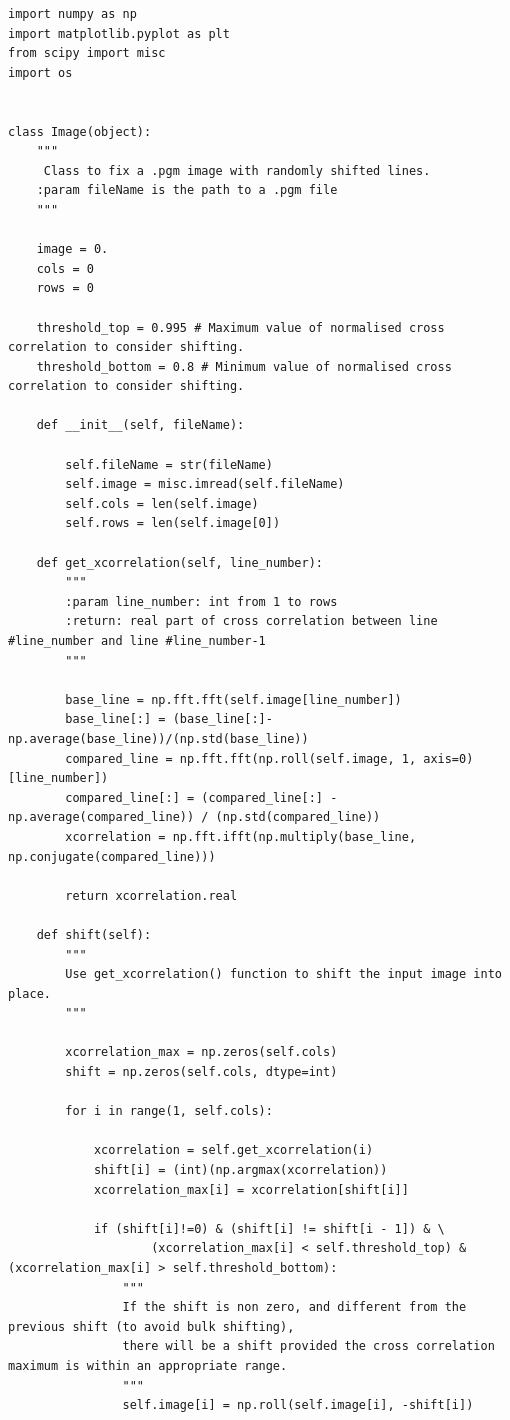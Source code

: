 \documentclass[a4paper,12pt]{article}
\begin{document}
\begin{lstlisting}[language=numpy]
import numpy as np
import matplotlib.pyplot as plt
from scipy import misc
import os


class Image(object):
    """
     Class to fix a .pgm image with randomly shifted lines.
    :param fileName is the path to a .pgm file
    """

    image = 0.
    cols = 0
    rows = 0

    threshold_top = 0.995 # Maximum value of normalised cross correlation to consider shifting.
    threshold_bottom = 0.8 # Minimum value of normalised cross correlation to consider shifting.

    def __init__(self, fileName):

        self.fileName = str(fileName)
        self.image = misc.imread(self.fileName)
        self.cols = len(self.image)
        self.rows = len(self.image[0])

    def get_xcorrelation(self, line_number):
        """
        :param line_number: int from 1 to rows
        :return: real part of cross correlation between line #line_number and line #line_number-1
        """

        base_line = np.fft.fft(self.image[line_number])
        base_line[:] = (base_line[:]-np.average(base_line))/(np.std(base_line))
        compared_line = np.fft.fft(np.roll(self.image, 1, axis=0)[line_number])
        compared_line[:] = (compared_line[:] - np.average(compared_line)) / (np.std(compared_line))
        xcorrelation = np.fft.ifft(np.multiply(base_line, np.conjugate(compared_line)))

        return xcorrelation.real

    def shift(self):
        """
        Use get_xcorrelation() function to shift the input image into place.
        """

        xcorrelation_max = np.zeros(self.cols)
        shift = np.zeros(self.cols, dtype=int)

        for i in range(1, self.cols):

            xcorrelation = self.get_xcorrelation(i)
            shift[i] = (int)(np.argmax(xcorrelation))
            xcorrelation_max[i] = xcorrelation[shift[i]]

            if (shift[i]!=0) & (shift[i] != shift[i - 1]) & \
                    (xcorrelation_max[i] < self.threshold_top) & (xcorrelation_max[i] > self.threshold_bottom):
                """
                If the shift is non zero, and different from the previous shift (to avoid bulk shifting),
                there will be a shift provided the cross correlation maximum is within an appropriate range.
                """
                self.image[i] = np.roll(self.image[i], -shift[i])


\end{lstlisting}
\end{document}
